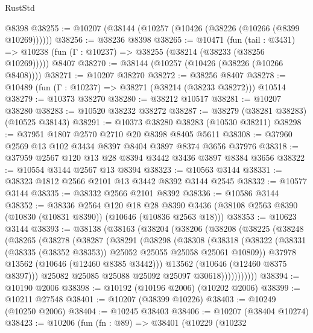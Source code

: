 \begin{lexlean}{RustStd}
\begin{coremodule}
    @8398
@38255 := @10207 (@38144 (@10257 (@10426 (@38226 (@10266 (@8399 @10269))))))
@38256 := @38236 @8398
@38265 := @10471
    (fun (tail : @3431) => @10238 (fun (Γ : @10237) => @38255 (@38214 (@38233 (@38256 @10269)))))
    @8407
@38270 := @38144 (@10257 (@10426 (@38226 (@10266 @8408))))
@38271 := @10207 @38270
@38272 := @38256 @8407
@38278 := @10489 (fun (Γ : @10237) => @38271 (@38214 (@38233 @38272))) @10514
@38279 := @10373 @38270
@38280 := @38212 @10517
@38281 := @10207 @38280
@38283 := @10520 @38232 @38272
@38287 := @38279 (@38281 @38283) (@10525 @38143)
@38291 := @10373 @38280 @38283 (@10530 @38211)
@38298 := @37951 @1807 @2570 @2710 @20 @8398 @8405 @5611
@38308 := @37960 @2569 @13 @102 @3434 @8397 @8404 @3897 @8374 @3656 @37976
@38318 := @37959 @2567 @120 @13 @28 @8394 @3442 @3436 @3897 @8384 @3656
@38322 := @10554 @3144 @2567 @13 @8394
@38323 := @10563 @3144
@38331 := @38323 @1812 @2566 @2101 @13 @3442 @8392 @3144 @2545
@38332 := @10577 @3144
@38335 := @38332 @2566 @2101 @8392
@38336 := @10586 @3144
@38352 := @38336
    @2564
    @120
    @18
    @28
    @8390
    @3436
    (@38108 @2563 @8390 (@10830 (@10831 @8390)) (@10646 (@10836 @2563 @18)))
@38353 := @10623 @3144
@38393 := @38138
    (@38163
      (@38204
        (@38206
          (@38208
            (@38225
              (@38248
                (@38265
                  (@38278
                    (@38287
                      (@38291
                        (@38298
                          (@38308
                            (@38318
                              (@38322
                                (@38331
                                  (@38335 (@38352 @38353))
                                  @25052
                                  @25055
                                  @25058
                                  @25061
                                  @10809))
                              @37978
                              @13562
                              (@10646 (@12460 @8385 @3442)))
                            @13562
                            (@10646 (@12460 @8375 @8397)))
                          @25082
                          @25085
                          @25088
                          @25092
                          @25097
                          @30618)))))))))))
@38394 := @10190 @2006
@38398 := @10192 (@10196 @2006) (@10202 @2006)
@38399 := @10211 @27548
@38401 := @10207 (@38399 @10226)
@38403 := @10249 (@10250 @2006)
@38404 := @10245 @38403
@38406 := @10207 (@38404 @10274)
@38423 := @10206
    (fun (fn : @89) =>
    @38401
      (@10229
        (@10232

\end{coremodule}
\end{lexlean}
